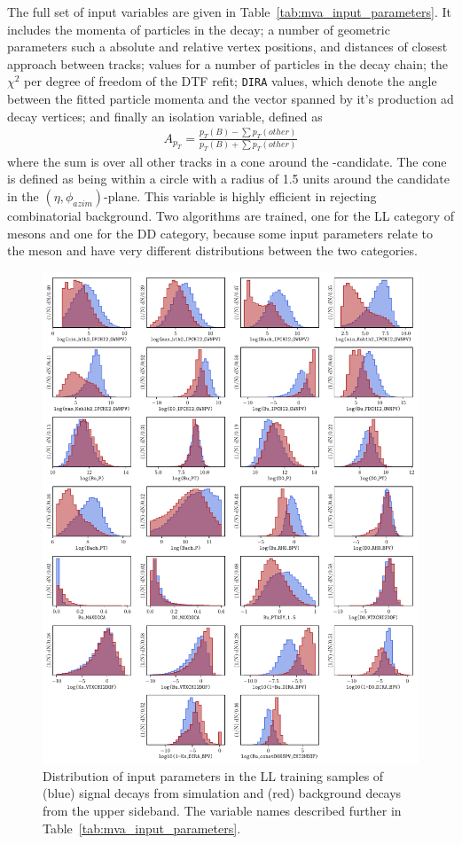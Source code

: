 The full set of input variables are given in Table~\ref{tab:mva_input_parameters}. It includes the momenta of particles in the decay; a number of geometric parameters such a absolute and relative vertex positions, and distances of closest approach between tracks; \ipchisq values for a number of particles in the decay chain; the $\chi^2$ per degree of freedom of the DTF refit; \texttt{DIRA} values, which denote the angle between the fitted particle momenta and the vector spanned by it's production ad decay vertices; and finally an isolation variable, defined as
\begin{align}
    A_{p_T} = \frac{p_T(B)-\sum p_T(other)}{p_T(B)+\sum p_T(other)}
\end{align}
where the sum is over all other tracks in a cone around the \B-candidate. The cone is defined as being within a circle with a radius of 1.5 units around the \B candidate in the $(\eta, \phi_{azim})$-plane. This variable is highly efficient in rejecting combinatorial background.
Two algorithms are trained, one for the LL category of \KS mesons and one for the DD category, because some input parameters relate to the \KS meson and have very different distributions between the two categories. 



\begin{figure}[p!]
    \centering
    \includegraphics[width=0.95\columnwidth]{figures/analysis/input_param_LL.pdf}
    \caption{Distribution of input parameters in the LL training samples of (blue) signal decays from simulation and (red) background decays from the upper \B sideband. The variable names described further in Table~\ref{tab:mva_input_parameters}.}
    \label{fig:input_variables_LL}
\end{figure}

